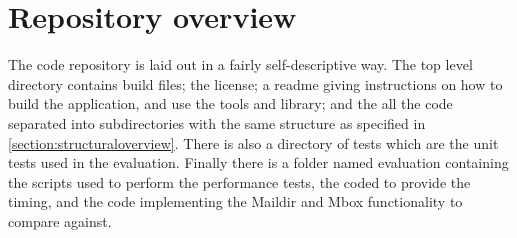 \section{Repository overview}

The code repository is laid out in a fairly self-descriptive way. The top level directory contains build files; the license; a readme giving instructions on how to build the application, and use the tools and library; and the all the code separated into subdirectories with the same structure as specified in \ref{section:structuraloverview}. There is also a directory of tests which are the unit tests used in the evaluation. Finally there is a folder named evaluation containing the scripts used to perform the performance tests, the coded to provide the timing, and the code implementing the Maildir and Mbox functionality to compare against.
